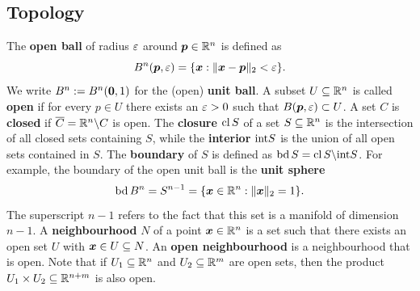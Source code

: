 \documentclass[11pt,a4paper]{memoir}
\begin{document}
\subsection{Topology}
\strictpagecheck
The \textbf{open ball} of radius $\varepsilon$ around $\bm{p}\in \mathbb{R}^n$ is defined as
\begin{equation*}
 B^n(\bm{p},\varepsilon) = \{\bm{x} \mathrel{\mathop{:}} \Vert {\bm{x}-\bm{p}}\Vert_2<\varepsilon\}.
\end{equation*}
We write $B^n:=B^n(\bm{0},1)$ for the (open) \textbf{unit ball}.
A subset $U\subseteq \mathbb{R}^n$ is called \textbf{open} if for every $p\in U$ there exists an $\varepsilon>0$ such that $B(\bm{p},\varepsilon)\subset U$. A set $C$ is \textbf{closed} if $\overline{C}=\mathbb{R}^n\backslash C$ is open. 
The \textbf{closure} $\operatorname{cl} S$ of a set $S\subseteq \mathbb{R}^n$ is the intersection of all closed sets containing $S$, while the \textbf{interior} ${\operatorname{int}} S$ is the union of all open sets contained in $S$. 
The \textbf{boundary} of $S$ is defined as $\operatorname{bd} S = \operatorname{cl} S\backslash {\operatorname{int}} S$. For example, the boundary of the open unit ball is the \textbf{unit sphere}
\begin{equation*}
 \operatorname{bd} B^n = S^{n-1} = \{\bm{x}\in \mathbb{R}^n \mathrel{\mathop{:}} \Vert {\bm{x}}\Vert_2 = 1\}.
\end{equation*}
The superscript $n-1$ refers to the fact that this set is a manifold of dimension $n-1$. A \strictpagecheck{}\textbf{neighbourhood} $N$ of a point $\bm{x}\in \mathbb{R}^n$ is a set such that there exists an open set $U$ with $\bm{x}\in U\subseteq N$. An \textbf{open neighbourhood} is a neighbourhood that is open. 
Note that if $U_1\subseteq \mathbb{R}^n$ and $U_2\subseteq \mathbb{R}^m$ are open sets, then the product $U_1\times U_2 \subseteq \mathbb{R}^{n+m}$ is also open. 
\end{document}
